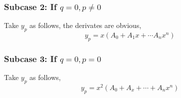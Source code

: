 \documentclass[oneside,11pt,pdftex,final]{book}%
\numberwithin{equation}{section}
\newtheorem{example}[theorem]{Example}
\numberwithin{section}{chapter}
\numberwithin{equation}{chapter}
\begin{document}
\subsubsection{Subcase 2: If $ q=0, p \neq 0 $}
Take $ y_p $ as follows, the derivates are obvious,
$$y_p=x(A_0+A_1x+\cdots A_nx^n) $$
\subsubsection{Subcase 3: If $ q=0,p=0$}
Take $ y_p $ as follows,
$$ y_p=x^2(A_0+A_x+\cdots + A_n x^n) $$


%
\end{document}
